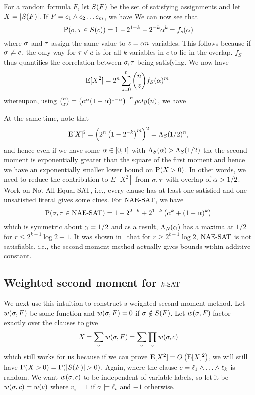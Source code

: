 \documentclass[letterpaper, 10pt, twocolumn, reqno]{amsart}
\begin{document}
For a random formula $F$, let $\sf$ be the set of satisfying assignments and let $X = \abs{\sf}$. If $F = c_1 \aand c_2 \ldots c_m$, we have
We can now see that
$$
\P(\s,\t \in \sc) = 1 -2^{1-k} - 2^{-k}\a^k = f_s(\a)
$$
where $\s$ and $\t$ assign the same value to $z = \a n$ variables. This follows because if $\s \not\sat c$, the only way for $\t \not\in c$ is for all $k$ variables in $c$ to lie in the overlap. $f_S$ thus quantifies the correlation between $\s,\t$ being satisfying. We now have
$$
\E[X^2] = 2^n \sum_{z=0}^n {n \choose z} f_S(\a)^m,
$$
whereupon, using ${n \choose z} = \rbrac{\a^\a (1-\a)^{1-\a}}^{-n} poly(n)$, we have

At the same time, note that
$$
\E[X]^2 = \rbrac{2^n \rbrac{1 - 2^{-k}}^m }^2 = \L_S(1/2)^n,
$$
and hence even if we have some $\a \in [0,1]$ with $\L_S(\a) > \L_S(1/2)$ the
the second moment is exponentially greater than the square of the first moment and hence we have an exponentially smaller lower bound on $\P(X > 0)$. In
other words, we need to reduce the contribution to $E[X^2]$ from $\s,\t$ with overlap of $\a > 1/2$. Work on Not All Equal-SAT, i.e., every clause has at
least one satisfied and one unsatisfied literal gives some clues. For $\NAESAT$, we have
$$
\P(\s,\t \in \NAESAT) = 1 - 2^{2-k} + 2^{1-k} \rbrac{\a^k + (1-\a)^k}
$$
which is symmetric about $\a = 1/2$ and as a result, $\L_N(\a)$ has a maxima at $1/2$ for $r \leq 2^{k-1} \log2 -1$. It was shown in~\cite{achlioptas2002asymptotic} that for $r \geq 2^{k-1} \log2$, $\NAESAT$ is not satisfiable, i.e., the second moment method actually gives bounds within additive constant.

\subsection{Weighted second moment for $\ksat$}
\label{ssec:ksat_weighted}
We next use this intuition to construct a weighted second moment method. Let $\wsf$ be some function and $\wsf = 0$ if $\s \notin \sf$. Let $\wsf$ factor exactly over the clauses to give
$$X = \sum_\s \wsf = \sum_\s \prod_c \wsc$$
which still works for us because if we can prove $\E[X^2] = \bigo\rbrac{\E[X]^2}$, we will still have $\P(X > 0) = \P(\abs{\sf} > 0)$. Again,
where the clause $c = \ell_1 \aand \ldots \aand \ell_k$ is random. We want $\wsc$ to be independent of variable labels, so let it be $\wsc = \wv$ where $v_i =1$ if $\s \sat \ell_i$ and $-1$ otherwise.
\end{document}
